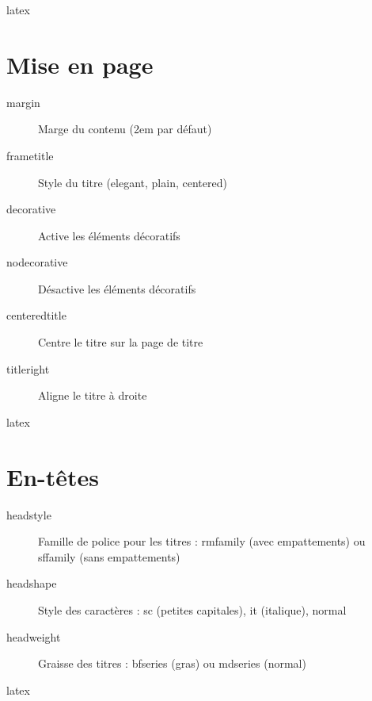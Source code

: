 \documentclass[french]{neoschool}
\begin{document}
\begin{code}{latex}
\end{code}

\section{Mise en page}
\begin{description}
\item[margin] Marge du contenu (\textcolor{titleColor}{2em} par défaut)
\item[frametitle] Style du titre (\textcolor{titleColor}{elegant}, \textcolor{titleColor}{plain}, \textcolor{titleColor}{centered})
\item[decorative] Active les éléments décoratifs
\item[nodecorative] Désactive les éléments décoratifs
\item[centeredtitle] Centre le titre sur la page de titre
\item[titleright] Aligne le titre à droite
\end{description}

\begin{code}{latex}
\end{code}

\section{En-têtes}
\begin{description}
\item[headstyle] Famille de police pour les titres : \textcolor{titleColor}{rmfamily} (avec empattements) ou \textcolor{titleColor}{sffamily} (sans empattements)
\item[headshape] Style des caractères : \textcolor{titleColor}{sc} (petites capitales), \textcolor{titleColor}{it} (italique), \textcolor{titleColor}{normal}
\item[headweight] Graisse des titres : \textcolor{titleColor}{bfseries} (gras) ou \textcolor{titleColor}{mdseries} (normal)
\end{description}

\begin{code}{latex}
\end{code}
\end{document}
